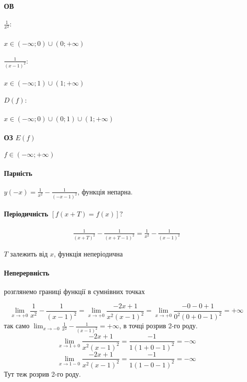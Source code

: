\documentclass[../rgr1.tex]{subfiles}
\begin{document}

\Solution

\paragraph{ОВ}
\subparagraph{$\frac{1}{x^2}:$} $x \in (-\infty;0)\cup(0;+\infty)$
\subparagraph{$\frac{1}{(x-1)^2}:$} $x \in (-\infty;1)\cup(1;+\infty)$
\subparagraph{$D(f):$} $x \in (-\infty;0)\cup(0;1)\cup(1;+\infty)$
\paragraph{ОЗ $E(f)$} $f \in ( -\infty; +\infty )$
\paragraph{Парність}
$
	y(-x) =
	\frac{1}{x^2} - \frac{1}{(-x-1)^2}
$, функція непарна.
\paragraph{Періодичність $[f(x+T) = f(x)]?$}

\begin{align}
	\frac{1}{(x+T)^2} - \frac{1}{(x+T-1)^2} =
	\frac{1}{x^2} - \frac{1}{(x-1)^2}
\end{align}

$T$ залежить від $x$, функція неперіодична

\paragraph{Неперервність} розглянемо границі функції в сумнівних точках

\begin{equation}
	\lim_{x\to+0}\frac{1}{x^2} - \frac{1}{(x-1)^2}
	= \lim_{x\to+0}\frac{-2x+1}{x^2(x-1)^2}
	= \lim_{x\to+0}\frac{-0-0+1}{0^2(0+0-1)^2}
	= +\infty
\end{equation}
так само $\lim_{x\to-0}\frac{1}{x^2} - \frac{1}{(x-1)^2} =+\infty$,
в точці розрив 2-го роду.
\begin{equation}
	\lim_{x\to 1+0}\frac{-2x+1}{x^2(x-1)^2}
	= \frac{-1}{1(1+0-1)^2}
	= -\infty
\end{equation}
\begin{equation}
	\lim_{x\to 1-0}\frac{-2x+1}{x^2(x-1)^2}
	= \frac{-1}{1(1-0-1)^2}
	= -\infty
\end{equation}
Тут теж розрив 2-го роду.
\end{document}
